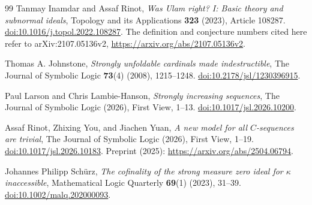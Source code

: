 \documentclass[11pt,a4paper]{amsart}
\theoremstyle{definition}
\theoremstyle{remark}
\begin{document}
\begin{thebibliography}{99}
Tanmay Inamdar and Assaf Rinot,
\emph{Was Ulam right? I: Basic theory and subnormal ideals},
Topology and its Applications \textbf{323} (2023), Article 108287.
\href{https://doi.org/10.1016/j.topol.2022.108287}
     {doi:10.1016/j.topol.2022.108287}.
The definition and conjecture numbers cited here refer to
arXiv:2107.05136v2,
\url{https://arxiv.org/abs/2107.05136v2}.

Thomas A. Johnstone,
\emph{Strongly unfoldable cardinals made indestructible},
The Journal of Symbolic Logic \textbf{73}(4) (2008), 1215--1248.
\href{https://doi.org/10.2178/jsl/1230396915}
     {doi:10.2178/jsl/1230396915}.

Paul Larson and Chris Lambie-Hanson,
\emph{Strongly increasing sequences},
The Journal of Symbolic Logic (2026), First View, 1--13.
\href{https://doi.org/10.1017/jsl.2026.10200}
     {doi:10.1017/jsl.2026.10200}.

Assaf Rinot, Zhixing You, and Jiachen Yuan,
\emph{A new model for all \(C\)-sequences are trivial},
The Journal of Symbolic Logic (2026), First View, 1--19.
\href{https://doi.org/10.1017/jsl.2026.10183}
     {doi:10.1017/jsl.2026.10183}.
Preprint (2025): \url{https://arxiv.org/abs/2504.06794}.

Johannes Philipp Sch\"urz,
\emph{The cofinality of the strong measure zero ideal for
                   \(\kappa\) inaccessible},
Mathematical Logic Quarterly \textbf{69}(1) (2023), 31--39.
\href{https://doi.org/10.1002/malq.202000093}
     {doi:10.1002/malq.202000093}.

\end{thebibliography}
\end{document}
